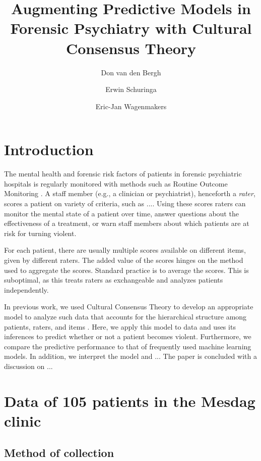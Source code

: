\documentclass[a4paper,11pt]{article}
\title{Augmenting Predictive Models in Forensic Psychiatry with Cultural Consensus Theory}
\author[1]{Don van den Bergh}
\author[2]{Erwin Schuringa}
\author[1]{Eric-Jan Wagenmakers}
\affil[1]{Department of Psychological Methods, University of Amsterdam}
\affil[2]{Forensic Psychiatric Centre Dr. S. van Mesdag}
\date{}
\begin{document}
\maketitle

\tableofcontents

\begin{abstract}

\end{abstract}

\section{Introduction}
The mental health and forensic risk factors of patients in forensic psychiatric hospitals is regularly monitored with methods such as
Routine Outcome Monitoring \parencite{deBeurs2011ROM}.
A staff member (e.g., a clinician or psychiatrist), henceforth a \emph{rater}, scores a patient on variety of criteria, such as ....
Using these scores raters can monitor the mental state of a patient over time, answer questions about the effectiveness of a treatment, or warn staff members about which patients are at risk for turning violent. 


For each patient, there are usually multiple scores available on different items, given by different raters.
The added value of the scores hinges on the method used to aggregate the scores.
Standard practice is to average the scores.
This is suboptimal, as this treats raters as exchangeable and analyzes patients independently.


In previous work, we used Cultural Consensus Theory \parencite[CCT;][]{romney1986culture, batchelder1988test, batchelder2012cultural} to develop an appropriate model to analyze such data that accounts for the hierarchical structure among patients, raters, and items \parencite{vandenBergh2020cultural}.
Here, we apply this model to data and uses its inferences to predict whether or not a patient becomes violent.
Furthermore, we compare the predictive performance to that of frequently used machine learning models.
In addition, we interpret the model and ...
The paper is concluded with a discussion on ...


\section{Data of 105 patients in the Mesdag clinic}
\subsection{Method of collection}
\end{document}
